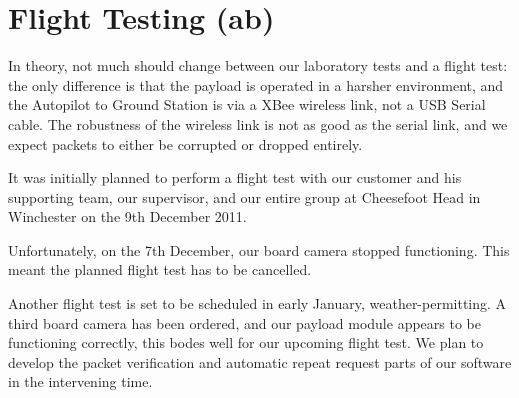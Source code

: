 
\section{Flight Testing (ab)}

In theory, not much should change between our laboratory tests and a flight 
test: the only difference is that the payload is operated in a 
harsher environment, and the Autopilot to Ground Station is via a XBee wireless 
link, not a USB Serial cable. The robustness of the wireless link is 
not as good as the serial link, and we expect packets to either be corrupted 
or dropped entirely.

It was initially planned to perform a flight test with our customer and his 
supporting team, our supervisor, and our entire group at Cheesefoot Head in 
Winchester on the 9th December 2011.

Unfortunately, on the 7th December, our board camera stopped functioning. 
This meant the planned flight test has to be cancelled.

Another flight test is set to be scheduled in early January, weather-permitting. 
A third board camera has been ordered, and our payload module appears to be 
functioning correctly, this bodes well for our upcoming flight test. We plan to develop the packet verification and 
automatic repeat request parts of our software in the intervening time.
